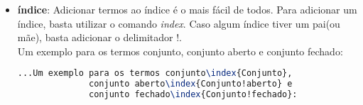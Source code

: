 \begin{itemize}
	\item \textbf{índice}: Adicionar termos ao índice é o mais fácil de todos. Para adicionar um índice, basta utilizar o comando \emph{index}. Caso algum índice tiver um pai(ou mãe), basta adicionar o delimitador !.\\
	Um exemplo para os termos conjunto, conjunto aberto e conjunto fechado:
	\begin{lstlisting}[language=tex]
		...Um exemplo para os termos conjunto\index{Conjunto},
		      conjunto aberto\index{Conjunto!aberto} e
		      conjunto fechado\index{Conjunto!fechado}:
	\end{lstlisting}
	
\end{itemize}

